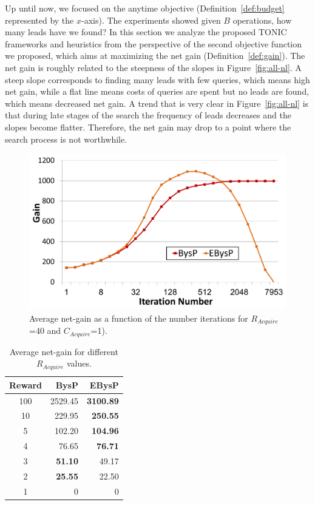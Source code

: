 \documentclass[journal]{IEEEtran}
\begin{document}
Up until now, we focused on the anytime objective (Definition~\ref{def:budget} represented by the $x$-axis). The experiments showed given $B$ operations, how many leads have we found?
In this section we analyze the proposed TONIC frameworks and heuristics from the perspective of the second objective function we proposed, which aims at maximizing the net gain (Definition~\ref{def:gain}). 
The net gain is roughly related to the steepness of the slopes in Figure~\ref{fig:all-nl}. A steep slope corresponds to finding many leads with few queries, which means high net gain, while a flat line means costs of queries are spent but no leads are found, which means decreased net gain. A trend that is very clear in Figure~\ref{fig:all-nl} is that during late stages of the search the frequency of leads decreases and the slopes become flatter. Therefore, the net gain may drop to a point where the search process is not worthwhile.

\begin{figure}
\centering
\includegraphics[width=.4\textwidth]{Cost_Iteration.pdf}
\caption{Average net-gain as a function of the number iterations for $R_{Acquire}$=40 and $C_{Acquire}$=1).}
\label{fig:CostIteration}
\end{figure}

\begin{table} 
  \centering
\begin{tabular}{|c|r|r|}
\hline 
Reward & BysP & EBysP \\\hline
100 & 2529.45 & {\bf 3100.89} \\
10 & 229.95 & {\bf 250.55} \\
5 & 102.20 & {\bf 104.96} \\
4 & 76.65 & {\bf 76.71} \\
3 & \textbf{51.10} & 49.17 \\
2 & \textbf{25.55} & 22.50 \\
1 & 0 & 0 \\
\hline 
\end{tabular}%
\caption{Average net-gain for different $R_{Acquire}$ values.}
\label{tab:Reward}
\end{table}
\end{document}
